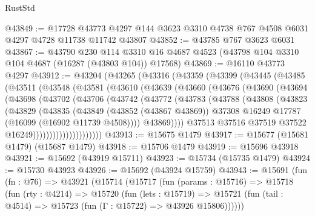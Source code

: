 \begin{lexlean}{RustStd}
\begin{coremodule}
@43849 := @17728
    @43773
    @4297
    @144
    @3623
    @3310
    @4738
    @767
    @4508
    @6031
    @4297
    @4728
    @11738
    @11742
    @43807
@43852 := @43785 @767 @3623 @6031
@43867 := @43790
    @230
    @114
    @3310
    @16
    @4687
    @4523
    (@43798 @104 @3310 @104 @4687 (@16287 (@43803 @104)) @17568)
@43869 := @16110 @43773 @4297
@43912 := @43204
    (@43265
      (@43316
        (@43359
          (@43399
            (@43445
              (@43485
                (@43511
                  (@43548
                    (@43581
                      (@43610
                        (@43639
                          (@43660
                            (@43676
                              (@43690
                                (@43694
                                  (@43698
                                    (@43702
                                      (@43706
                                        (@43742
                                          (@43772
                                            (@43783
                                              (@43788
                                                (@43808
                                                  (@43823
                                                    (@43829
                                                      (@43835
                                                        (@43849
                                                          (@43852 (@43867 @43869))
                                                          @37308
                                                          @16249
                                                          @17787
                                                          (@16099 (@16902 @11739 @4508))))
                                                      @43869))))
                                              @37513
                                              @37516
                                              @37519
                                              @37522
                                              @16249)))))))))))))))))))))
@43913 := @15675 @1479
@43917 := @15677 (@15681 @1479) (@15687 @1479)
@43918 := @15706 @1479
@43919 := @15696 @43918
@43921 := @15692 (@43919 @15711)
@43923 := @15734 (@15735 @1479)
@43924 := @15730 @43923
@43926 := @15692 (@43924 @15759)
@43943 := @15691
    (fun (fn : @76) =>
    @43921
      (@15714
        (@15717
          (fun (params : @15716) =>
          @15718
            (fun (rty : @4214) =>
            @15720
              (fun (lets : @15719) =>
              @15721 (fun (tail : @4514) => @15723 (fun (Γ : @15722) => @43926 @15806))))))

\end{coremodule}
\end{lexlean}
